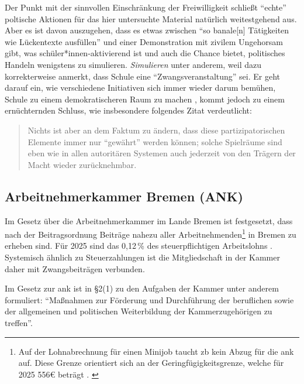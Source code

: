 Der Punkt mit der sinnvollen Einschränkung der Freiwilligkeit schließt \enquote{echte} poltische Aktionen für das hier untersuchte Material natürlich weitestgehend aus. Aber es ist davon auszugehen, dass es etwas zwischen \enquote{so banale[n] Tätigkeiten wie Lückentexte ausfüllen} \autocite[466]{Nonnenmacher2010} und einer Demonstration mit zivilem Ungehorsam gibt, was schüler*innen-aktivierend ist und auch die Chance bietet, politisches Handeln wenigstens zu simulieren. 
\emph{Simulieren} unter anderem, weil \textcite[467]{Nonnenmacher2010} dazu korrekterweise anmerkt, dass Schule eine \enquote{Zwangsveranstaltung} sei. Er geht darauf ein, wie verschiedene Initiativen sich immer wieder darum bemühen, Schule zu einem demokratischeren Raum zu machen \autocite[467-469]{Nonnenmacher2010}, kommt jedoch zu einem ernüchternden Schluss, wie insbesondere folgendes Zitat verdeutlicht:
\begin{quote}
    Nichts ist aber an dem Faktum zu ändern, dass diese partizipatorischen Elemente immer nur \enquote{gewährt} werden können; solche Spielräume sind eben wie in allen autoritären Systemen auch jederzeit von den Trägern der Macht wieder zurücknehmbar. 

    \autocite[468]{Nonnenmacher2010}
\end{quote}



\subsection{Arbeitnehmerkammer Bremen (ANK) \label{ank}}
Im Gesetz über die Arbeitnehmerkammer im Lande Bremen \autocite[]{ArbnkG} ist festgesetzt, dass nach der Beitragsordnung \autocite[]{ArbnkB} Beiträge nahezu aller Arbeitnehmenden\footnote{ 
    Auf der Lohnabrechnung für einen Minijob taucht \gls{zb} kein Abzug für die \gls{ank} auf. Diese Grenze orientiert sich an der Geringfügigkeitsgrenze, welche für 2025 556€ beträgt \autocites{b.gering}{banz.gering}. \label{Geringfügigkeitsgrenze}} 
in Bremen zu erheben sind. Für 2025 sind das 0,12\,\% des steuerpflichtigen Arbeitslohns \autocite{ANKBeitragAb2025}. Systemisch ähnlich zu Steuerzahlungen ist die Mitgliedschaft in der Kammer daher mit Zwangsbeiträgen verbunden. 

Im Gesetz zur \gls{ank} ist in \S2(1) \autocite[1]{ArbnkG} zu den Aufgaben der Kammer unter anderem formuliert: \enquote{Maßnahmen zur Förderung und Durchführung der beruflichen sowie der allgemeinen und politischen Weiterbildung der Kammerzugehörigen zu treffen}.

